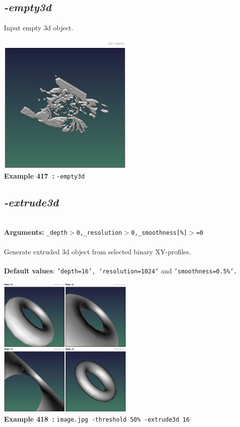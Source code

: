 \documentclass[a4paper,11pt,twoside]{book}
\begin{document}
\subsection{\emph{-empty3d} }\vspace*{-0.5em}
Input empty 3d object.
\begin{center}\includegraphics[keepaspectratio=true,height=7cm,width=\textwidth]{img/gmic_def417.jpg}\\
{\footnotesize \textbf{Example 417~:} \texttt{-empty3d}}
\end{center}

\subsection{\emph{-extrude3d} }\vspace*{-0.5em}
~\\\textbf{Arguments: } 
{\small \texttt{\_depth$>$0,\_resolution$>$0,\_smoothness[\%]$>$=0}}\\~\\
Generate extruded 3d object from selected binary XY-profiles.
~\\~\\\textbf{Default values}: {\small \texttt{'depth=16', 'resolution=1024'} and \texttt{'smoothness=0.5\%'.}}
\begin{center}\includegraphics[keepaspectratio=true,height=7cm,width=\textwidth]{img/gmic_def418.jpg}\\
{\footnotesize \textbf{Example 418~:} \texttt{image.jpg -threshold 50\% -extrude3d 16}}
\end{center}
\end{document}
